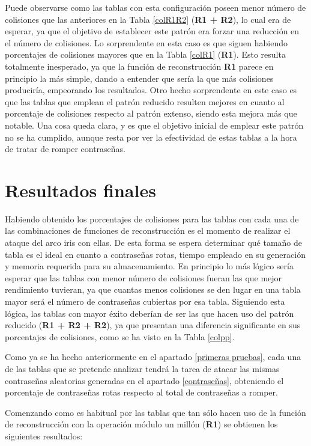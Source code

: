 \documentclass[12pt,spanish,listoffigures,listoftables]{tfgetsinf}
\begin{document}
Puede observarse como las tablas con esta configuración poseen menor número de colisiones que las anteriores en la Tabla \ref{colR1R2} (\textbf{R1 + R2}), lo cual era de esperar, ya que el objetivo de establecer este patrón era forzar una reducción en el número de colisiones. Lo sorprendente en esta caso es que siguen habiendo porcentajes de colisiones mayores que en la Tabla \ref{colR1} (\textbf{R1}). Esto resulta totalmente inesperado, ya que la función de reconstrucción \textbf{R1} parece en principio la más simple, dando a entender que sería la que más colisiones produciría, empeorando los resultados. Otro hecho sorprendente en este caso es que las tablas que emplean el patrón reducido resulten mejores en cuanto al porcentaje de colisiones respecto al patrón extenso, siendo esta mejora más que notable. Una cosa queda clara, y es que el objetivo inicial de emplear este patrón no se ha cumplido, aunque resta por ver la efectividad de estas tablas a la hora de tratar de romper contraseñas.

\section{Resultados finales}

Habiendo obtenido los porcentajes de colisiones para las tablas con cada una de las combinaciones de funciones de reconstrucción es el momento de realizar el ataque del arco iris con ellas. De esta forma se espera determinar qué tamaño de tabla es el ideal en cuanto a contraseñas rotas, tiempo empleado en su generación y memoria requerida para su almacenamiento. En principio lo más lógico sería esperar que las tablas con menor número de colisiones fueran las que mejor rendimiento tuvieran, ya que cuantas menos colisiones se den lugar en una tabla mayor será el número de contraseñas cubiertas por esa tabla. Siguiendo esta lógica, las tablas con mayor éxito deberían de ser las que hacen uso del patrón reducido (\textbf{R1 + R2 + R2}), ya que presentan una diferencia significante en sus porcentajes de colisiones, como se ha visto en la Tabla \ref{colpp}.

Como ya se ha hecho anteriormente en el apartado \ref{primeras pruebas}, cada una de las tablas que se pretende analizar tendrá la tarea de atacar las mismas contraseñas aleatorias generadas en el apartado \ref{contraseñas}, obteniendo el porcentaje de contraseñas rotas respecto al total de contraseñas a romper.

Comenzando como es habitual por las tablas que tan sólo hacen uso de la función de reconstrucción con la operación módulo un millón (\textbf{R1}) se obtienen los siguientes resultados:
\end{document}
